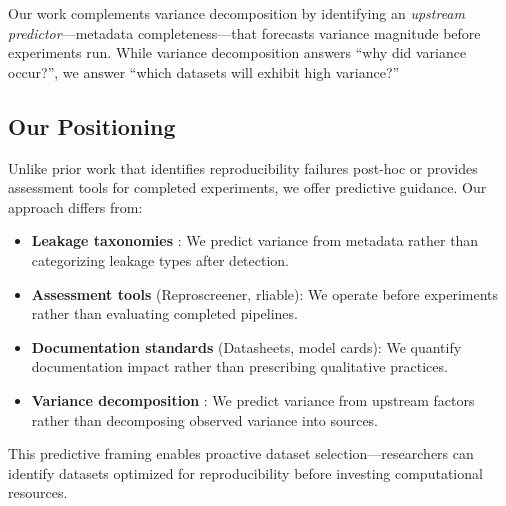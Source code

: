 Our work complements variance decomposition by identifying an \emph{upstream predictor}---metadata completeness---that forecasts variance magnitude before experiments run. While variance decomposition answers ``why did variance occur?'', we answer ``which datasets will exhibit high variance?''

\subsection{Our Positioning}

Unlike prior work that identifies reproducibility failures post-hoc or provides assessment tools for completed experiments, we offer predictive guidance. Our approach differs from:

\begin{itemize}
    \item \textbf{Leakage taxonomies} \citep{kapoor2022leakage}: We predict variance from metadata rather than categorizing leakage types after detection.
    \item \textbf{Assessment tools} (Reproscreener, rliable): We operate before experiments rather than evaluating completed pipelines.
    \item \textbf{Documentation standards} (Datasheets, model cards): We quantify documentation impact rather than prescribing qualitative practices.
    \item \textbf{Variance decomposition} \citep{bouthillier2021variance}: We predict variance from upstream factors rather than decomposing observed variance into sources.
\end{itemize}

This predictive framing enables proactive dataset selection---researchers can identify datasets optimized for reproducibility before investing computational resources.
